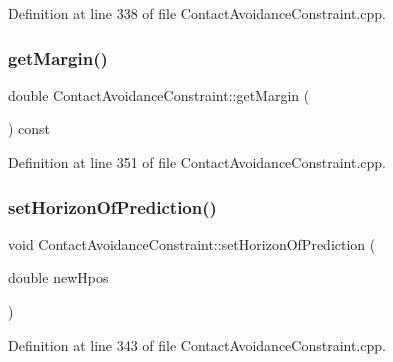 Definition at line 338 of file Contact\+Avoidance\+Constraint.\+cpp.

\hypertarget{classocra_1_1ContactAvoidanceConstraint_acb8dff3c7d62c30edc180e3526ee8f94}{}\label{classocra_1_1ContactAvoidanceConstraint_acb8dff3c7d62c30edc180e3526ee8f94} 
\subsubsection{\texorpdfstring{get\+Margin()}{getMargin()}}
{\footnotesize\ttfamily double Contact\+Avoidance\+Constraint\+::get\+Margin (\begin{DoxyParamCaption}{ }\end{DoxyParamCaption}) const}



Definition at line 351 of file Contact\+Avoidance\+Constraint.\+cpp.

\hypertarget{classocra_1_1ContactAvoidanceConstraint_a667de1446a83d166c7979b6066dd0720}{}\label{classocra_1_1ContactAvoidanceConstraint_a667de1446a83d166c7979b6066dd0720} 
\subsubsection{\texorpdfstring{set\+Horizon\+Of\+Prediction()}{setHorizonOfPrediction()}}
{\footnotesize\ttfamily void Contact\+Avoidance\+Constraint\+::set\+Horizon\+Of\+Prediction (\begin{DoxyParamCaption}\item[{double}]{new\+Hpos }\end{DoxyParamCaption})}



Definition at line 343 of file Contact\+Avoidance\+Constraint.\+cpp.

\hypertarget{classocra_1_1ContactAvoidanceConstraint_a3504dbfab2c8e829bb73960891f4dd01}{}\label{classocra_1_1ContactAvoidanceConstraint_a3504dbfab2c8e829bb73960891f4dd01} 
